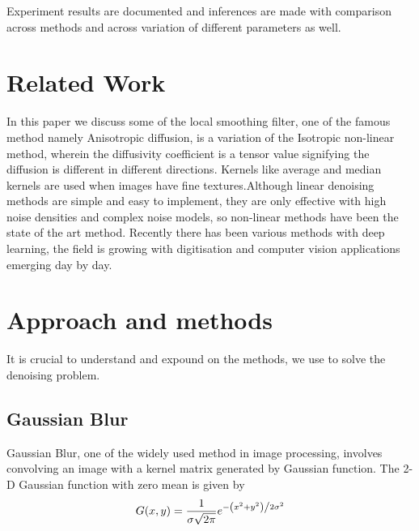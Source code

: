 \documentclass{ipol}
\begin{document}
Experiment results are documented and inferences are made with comparison across methods and across variation of different parameters as well.






\section{Related Work}

In this paper we discuss some of the local smoothing filter, one of the famous method namely Anisotropic diffusion, is a variation of the Isotropic non-linear method, wherein the diffusivity coefficient is a tensor value signifying the diffusion is different in different directions\cite{Buades2005}. Kernels like average and median kernels are used when images have fine textures\cite{Zhang2015a}.Although linear denoising methods are simple and easy to implement, they are only effective with high noise densities and complex noise models, so non-linear methods have been the state of the art method\cite{Zhang2015a}. Recently there has been various methods with deep learning, the field is growing with digitisation and computer vision applications emerging day by day.


\section{Approach and methods}

It is crucial to understand and expound on the methods, we use to solve the denoising problem.

\subsection{Gaussian Blur}


Gaussian Blur, one of the widely used method in image processing, involves convolving an image with a kernel matrix generated by Gaussian function. The 2-D Gaussian function with zero mean is given by
\begin{displaymath}
G(x,y) = \frac{1}{{\sigma \sqrt {2\pi } }}e^{{{ - \left( {x^2 + y^2} \right)} \mathord{\left/ {\vphantom {{ - \left( {x^2 + y^2} \right)} {2\sigma ^2 }}} \right. \kern-\nulldelimiterspace} {2\sigma ^2 }}}
\end{displaymath}
 
\end{document}
